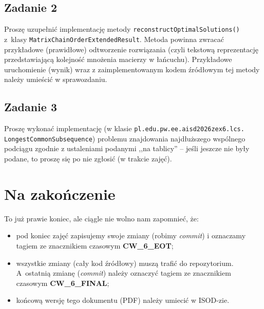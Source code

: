 \documentclass[twoside]{article}
\begin{document}
\subsection{Zadanie 2}
Proszę uzupełnić implementację metody \verb|reconstructOptimalSolutions()| z~klasy 
\verb|MatrixChainOrderExtendedResult|. 
Metoda powinna zwracać przykładowe (prawidłowe) odtworzenie rozwiązania (czyli tekstową 
reprezentację przedstawiającą kolejność mnożenia macierzy w łańcuchu).
Przykładowe uruchomienie (wynik) wraz z zaimplementowanym kodem źródłowym tej metody należy
umieścić w sprawozdaniu.

\subsection{Zadanie 3}
Proszę wykonać implementację (w klasie 
\verb|pl.edu.pw.ee.aisd2026zex6.lcs.| \verb|LongestCommonSubsequence|) 
problemu znajdowania najdłuższego wspólnego 
podciągu zgodnie z ustaleniami podanymi ,,na tablicy'' -- jeśli jeszcze nie były podane, to proszę 
się po nie zgłosić (w trakcie zajęć).

\section{Na zakończenie}
To już prawie koniec, ale ciągle nie wolno nam zapomnieć, że:
\begin{itemize}
    \item pod koniec zajęć zapisujemy swoje zmiany (robimy \textit{commit}) i oznaczamy tagiem ze znacznikiem czasowym \textbf{CW\_6\_EOT};
    \item wszystkie zmiany (cały kod źródłowy) muszą trafić do repozytorium.    
    A~ostatnią zmianę (\textit{commit}) należy oznaczyć tagiem ze znacznikiem czasowym \textbf{CW\_6\_FINAL};    
    \item końcową wersję tego dokumentu (PDF) należy umiecić w ISOD-zie.
\end{itemize}
\end{document}
